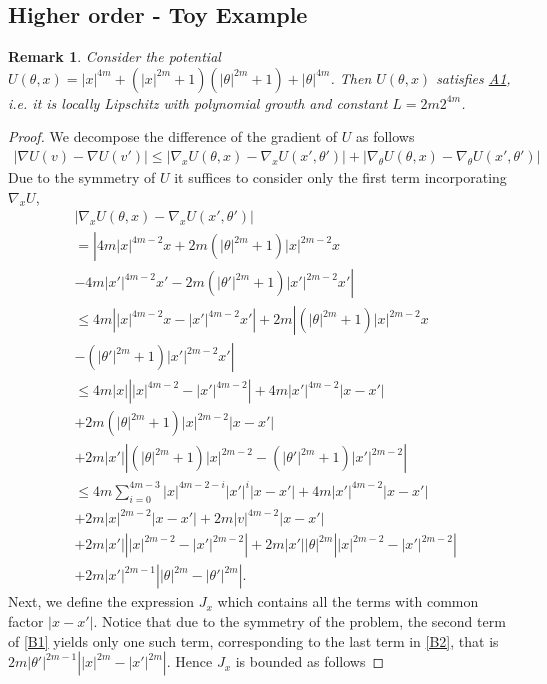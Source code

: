 \documentclass[a4paper, 10pt]{article}
\theoremstyle{plain}%
\newtheorem{remark}{Remark}
\begin{document}
\subsection{Higher order - Toy Example}
\begin{remark}\label{remark5}
    Consider the potential $U(\theta,x)=|x|^{4m}+(|x|^{2m}+1)(|\theta|^{2m}+1)+|\theta|^{4m}$. Then $U(\theta,x)$ satisfies \hyperlink{Assum1}{A1}, i.e. it is locally Lipschitz with polynomial growth and constant $L=2m2^{4m}$.
\end{remark}
\begin{proof}
    We decompose the difference of the gradient of $U$ as follows
\begin{align}
    |\nabla U(v)-\nabla U(v')|\leq|\nabla_x U(\theta,x)-\nabla_x U(x',\theta')|+|\nabla_{\theta} U(\theta,x)-\nabla_{\theta} U(x',\theta')|\label{B1}
\end{align}
Due to the symmetry of $U$ it suffices to consider only the first term incorporating $\nabla_x U$,
\begin{align}
    &|\nabla_x U(\theta,x)-\nabla_x U(x',\theta')|\nonumber\\&=\left|4m|x|^{4m-2}x+2m\left(|\theta|^{2m}+1\right)|x|^{2m-2}x\right.\nonumber\\ 
    &\left.-4m|x'|^{4m-2}x'-2m\left(|\theta'|^{2m}+1\right)|x'|^{2m-2}x'\right|\nonumber\\ 
    &\leq 4m\left||x|^{4m-2}x-|x'|^{4m-2}x'\right|+2m\left|\left(|\theta|^{2m}+1\right)|x|^{2m-2}x\right.\nonumber\\
    &\left.-\left(|\theta'|^{2m}+1\right)|x'|^{2m-2}x'\right|\nonumber\\
    &\leq 4m|x|\left||x|^{4m-2}-|x'|^{4m-2}\right|+4m|x'|^{4m-2}|x-x'|\nonumber\\
    &+2m\left(|\theta|^{2m}+1\right)|x|^{2m-2}|x-x'|\nonumber\\
    &+2m|x'|\left|\left(|\theta|^{2m}+1\right)|x|^{2m-2}-\left(|\theta'|^{2m}+1\right)|x'|^{2m-2}\right|\nonumber\\
    &\leq4m\sum_{i=0}^{4m-3}|x|^{4m-2-i}|x'|^{i}|x-x'|+4m|x'|^{4m-2}|x-x'|\nonumber\\
    &+2m|x|^{2m-2}|x-x'|+2m|v|^{4m-2}|x-x'|\nonumber\\
    &+2m|x'|\left||x|^{2m-2}-|x'|^{2m-2}\right|+2m|x'||\theta|^{2m}\left||x|^{2m-2}-|x'|^{2m-2}\right|\nonumber\\
    &+2m|x'|^{2m-1}\left||\theta|^{2m}-|\theta'|^{2m}\right|\label{B2}.
\end{align}
Next, we define the expression $J_x$ which contains all the terms with common factor $|x-x'|$. Notice that due to the symmetry of the problem, the second term of \eqref{B1} yields only one such term, corresponding to the last term in \eqref{B2}, that is $2m|\theta'|^{2m-1}\left||x|^{2m}-|x'|^{2m}\right|$. Hence $J_x$ is bounded as follows

\end{proof}
\end{document}
